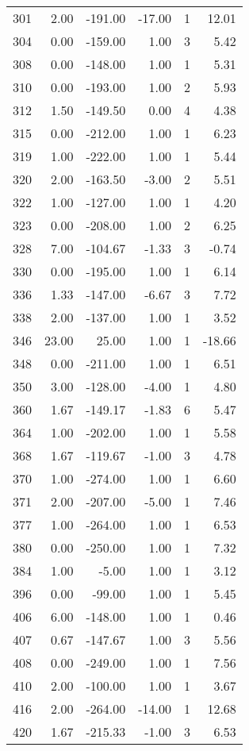 \begin{appendices}
\begin{longtable}[c]{@{}rrrrrr@{}}
301 & 2.00 & -191.00 & -17.00 & 1 & 12.01 \\
304 & 0.00 & -159.00 & 1.00 & 3 & 5.42 \\
308 & 0.00 & -148.00 & 1.00 & 1 & 5.31 \\
310 & 0.00 & -193.00 & 1.00 & 2 & 5.93 \\
312 & 1.50 & -149.50 & 0.00 & 4 & 4.38 \\
315 & 0.00 & -212.00 & 1.00 & 1 & 6.23 \\
319 & 1.00 & -222.00 & 1.00 & 1 & 5.44 \\
320 & 2.00 & -163.50 & -3.00 & 2 & 5.51 \\
322 & 1.00 & -127.00 & 1.00 & 1 & 4.20 \\
323 & 0.00 & -208.00 & 1.00 & 2 & 6.25 \\
328 & 7.00 & -104.67 & -1.33 & 3 & -0.74 \\
330 & 0.00 & -195.00 & 1.00 & 1 & 6.14 \\
336 & 1.33 & -147.00 & -6.67 & 3 & 7.72 \\
338 & 2.00 & -137.00 & 1.00 & 1 & 3.52 \\
346 & 23.00 & 25.00 & 1.00 & 1 & -18.66 \\
348 & 0.00 & -211.00 & 1.00 & 1 & 6.51 \\
350 & 3.00 & -128.00 & -4.00 & 1 & 4.80 \\
360 & 1.67 & -149.17 & -1.83 & 6 & 5.47 \\
364 & 1.00 & -202.00 & 1.00 & 1 & 5.58 \\
368 & 1.67 & -119.67 & -1.00 & 3 & 4.78 \\
370 & 1.00 & -274.00 & 1.00 & 1 & 6.60 \\
371 & 2.00 & -207.00 & -5.00 & 1 & 7.46 \\
377 & 1.00 & -264.00 & 1.00 & 1 & 6.53 \\
380 & 0.00 & -250.00 & 1.00 & 1 & 7.32 \\
384 & 1.00 & -5.00 & 1.00 & 1 & 3.12 \\
396 & 0.00 & -99.00 & 1.00 & 1 & 5.45 \\
406 & 6.00 & -148.00 & 1.00 & 1 & 0.46 \\
407 & 0.67 & -147.67 & 1.00 & 3 & 5.56 \\
408 & 0.00 & -249.00 & 1.00 & 1 & 7.56 \\
410 & 2.00 & -100.00 & 1.00 & 1 & 3.67 \\
416 & 2.00 & -264.00 & -14.00 & 1 & 12.68 \\
420 & 1.67 & -215.33 & -1.00 & 3 & 6.53 \\

\end{longtable}
\end{appendices}

